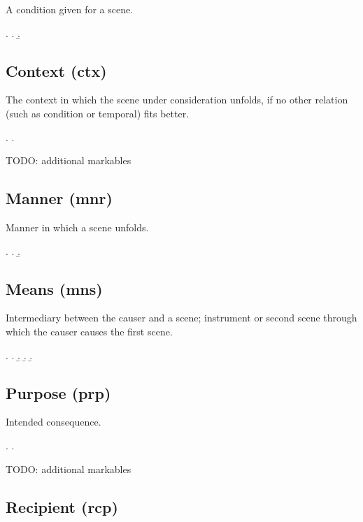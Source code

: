 \documentclass[a4paper]{article}
\begin{document}
A condition given for a scene.

\ex.
\a. 
\b. 

\clearpage
\subsection{Context (\textsf{ctx})}
\label{sec:ctx}

The context in which the scene under consideration unfolds, if no other
relation (such as condition or temporal) fits better.

\ex.
\a. 

TODO: additional markables

\clearpage
\subsection{Manner (\textsf{mnr})}
\label{sec:mnr}

Manner in which a scene unfolds.

\ex.
\a. 
\b. 

\clearpage
\subsection{Means (\textsf{mns})}
\label{sec:mns}

Intermediary between the causer and a scene; instrument or second scene through
which the causer causes the first scene.

\ex.
\a. 
\b. 
\b. 
\b. 

\clearpage
\subsection{Purpose (\textsf{prp})}
\label{sec:prp}

Intended consequence.

\ex.
\a. 

TODO: additional markables

\clearpage
\subsection{Recipient (\textsf{rcp})}
\label{sec:rcp}
\end{document}
